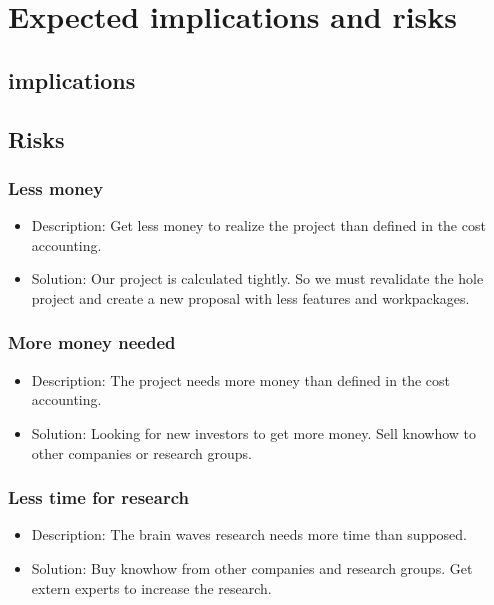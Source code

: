 \section{Expected implications and risks}
\label{sect:implication-risk}

\subsection*{implications}


\subsection*{Risks}

\subsubsection*{Less money}
\begin{itemize}
 \item Description: Get less money to realize the project than defined in the cost accounting.
 \item Solution: Our project is calculated tightly. So we must revalidate the hole project and create a new proposal with less features and workpackages.
\end{itemize}

\subsubsection*{More money needed}
\begin{itemize}
 \item Description: The project needs more money than defined in the cost accounting.
 \item Solution: Looking for new investors to get more money. Sell knowhow to other companies or research groups.
\end{itemize}

\subsubsection*{Less time for research}
\begin{itemize}
 \item Description: The brain waves research needs more time than supposed.
 \item Solution: Buy knowhow from other companies and research groups. Get extern experts to increase the research.
\end{itemize}

